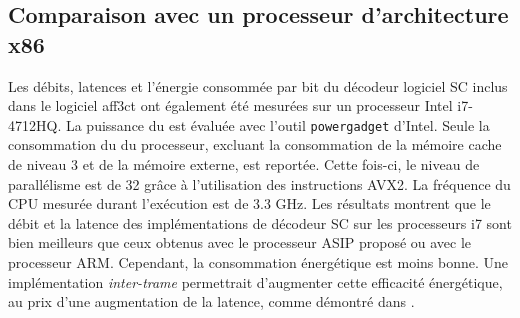 \subsection{Comparaison avec un processeur d'architecture x86}
Les débits, latences et l'énergie consommée par bit du décodeur logiciel SC inclus dans le logiciel aff3ct ont également été mesurées sur un processeur Intel i7-4712HQ.
La puissance du \coeur est évaluée avec l'outil \texttt{powergadget} d'Intel. Seule la consommation du \coeur du processeur, excluant la consommation de la mémoire cache de niveau 3 et de la mémoire externe, est reportée. Cette fois-ci, le niveau de parallélisme est de 32 grâce à l'utilisation des instructions AVX2. La fréquence du CPU mesurée durant l'exécution est de 3.3 GHz. Les résultats montrent que le débit et la latence des implémentations de décodeur SC sur les processeurs i7 sont bien meilleurs que ceux obtenus avec le processeur ASIP proposé ou avec le processeur ARM. Cependant, la consommation énergétique est moins bonne. Une implémentation \textit{inter-trame} permettrait d'augmenter cette efficacité énergétique, au prix d'une augmentation de la latence, comme démontré dans \cite{cassagne_energy_2016}.


